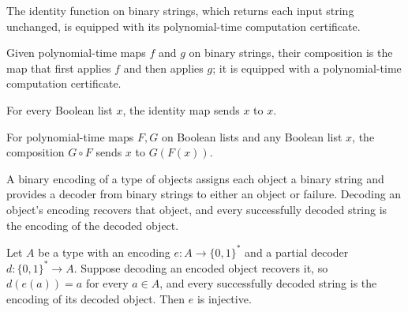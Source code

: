 \begin{definition}
\label{FABL.PolytimeMap.id}
\leanok
{}
The identity function on binary strings, which returns each input string unchanged, is
equipped with its polynomial-time computation certificate.
\end{definition}

\begin{definition}
\label{FABL.PolytimeMap.comp}
\leanok
{}
Given polynomial-time maps $f$ and $g$ on binary strings, their composition is the map
that first applies $f$ and then applies $g$; it is equipped with a polynomial-time
computation certificate.
\end{definition}

\begin{theorem}
\label{FABL.PolytimeMap.id_apply}
\leanok
{}
For every Boolean list $x$, the identity map sends $x$ to $x$.
\end{theorem}

\begin{theorem}
\label{FABL.PolytimeMap.comp_apply}
\leanok
{}
For polynomial-time maps $F,G$ on Boolean lists and any Boolean list $x$, the
composition $G\circ F$ sends $x$ to $G(F(x))$.
\end{theorem}

\begin{definition}
\label{FABL.BinaryEncoding}
\leanok
A binary encoding of a type of objects assigns each object a binary string and provides
a decoder from binary strings to either an object or failure. Decoding an object's
encoding recovers that object, and every successfully decoded string is the encoding of
the decoded object.
\end{definition}

\begin{theorem}
\label{FABL.BinaryEncoding.encode_injective}
\leanok
{}
Let $A$ be a type with an encoding $e:A\to\{0,1\}^*$ and a partial decoder
$d:\{0,1\}^*\to A$. Suppose decoding an encoded object recovers it, so $d(e(a))=a$ for
every $a\in A$, and every successfully decoded string is the encoding of its decoded
object. Then $e$ is injective.
\end{theorem}

